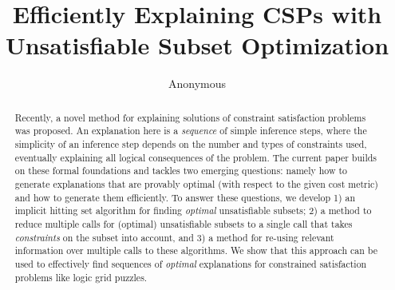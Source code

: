 \documentclass{article}
\title{Efficiently Explaining CSPs with Unsatisfiable Subset Optimization}
\author{Anonymous}
\newcommand\maxsat{MaxSAT\xspace}
\begin{document}
 
\maketitle

\begin{abstract}
Recently, a novel method for explaining solutions of constraint satisfaction problems was proposed. 
% 
An explanation here is a \textit{sequence} of simple inference steps, where the simplicity of an inference step depends on the number and types of constraints used, eventually explaining all logical consequences of the problem. 
The current paper %
builds on these formal foundations and tackles two emerging questions: namely how to generate explanations that are provably optimal (with respect to the given cost metric) and how to generate them efficiently. 
To answer these questions, we develop 1) an implicit hitting set algorithm for finding \textit{optimal} unsatisfiable subsets; 2) a method to reduce multiple calls for (optimal) unsatisfiable subsets to a single call that takes \emph{constraints} on the subset into account, and 3) a method for re-using relevant information over multiple calls to these algorithms. 
We show that this approach can be used to effectively find sequences of \textit{optimal} explanations for constrained satisfaction problems like logic grid puzzles.
\end{abstract}
\end{document}

